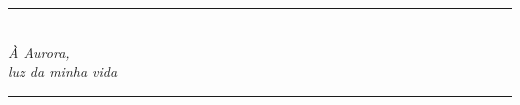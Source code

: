 \begin{titlingpage}
    
        
    \vspace*{\fill}
   	\centering
   	\noindent
    \noindent\rule{5cm}{0.4pt}\\
    \vspace*{0.4cm}
    \large\textit{À Aurora,\\luz da minha vida}\\
    \noindent\rule{5cm}{0.4pt}
    \vspace*{\fill}
    
    \restoregeometry
    
\end{titlingpage}